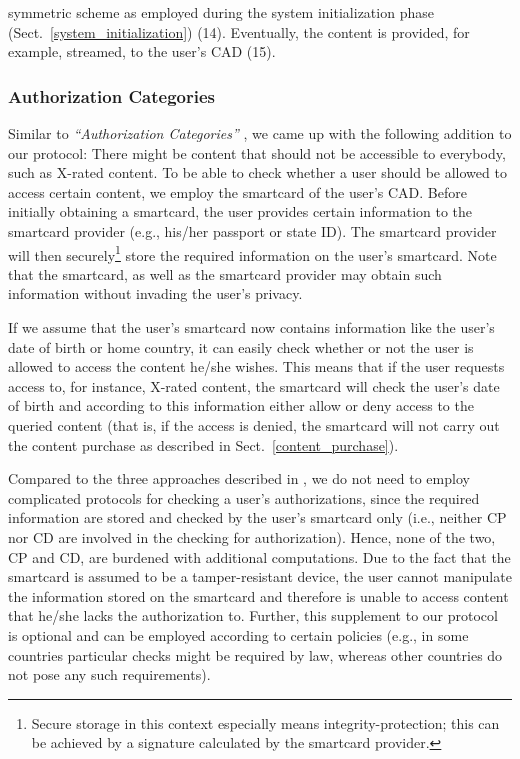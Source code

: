 \documentclass{llncs}
\newcommand{\refSec}[1]{Sect.~\ref{#1}}
\begin{document}
symmetric scheme as employed during the system initialization phase (\refSec{system_initialization}) (14). Eventually, the content is provided, for example, streamed, to the user's CAD (15). 




\subsubsection{Authorization Categories} \label{authorization_categories}

Similar to \emph{``Authorization Categories''} \cite{perlman_privacy_preserving}, we came up with the following addition to our protocol: There might be content that should not be accessible to everybody, such as X-rated content. To be able to check whether a user should be allowed to access certain content, we employ the smartcard of the user's CAD. Before initially obtaining a smartcard, the user provides certain information to the smartcard provider (e.g., his/her passport or state ID). The smartcard provider will then securely\footnote{Secure storage in this context especially means integrity-protection; this can be achieved by a signature calculated by the smartcard provider.} store the required information on the user's smartcard. Note that the smartcard, as well as the smartcard provider may obtain such information without invading the user's privacy.

If we assume that the user's smartcard now contains information like the user's date of birth or home country, it can easily check whether or not the user is allowed to access the content he/she wishes. This means that if the user requests access to, for instance, X-rated content, the smartcard will check the user's date of birth and according to this information either allow or deny access to the queried content (that is, if the access is denied, the smartcard will not carry out the content purchase as described in \refSec{content_purchase}).

Compared to the three approaches described in \cite{perlman_privacy_preserving}, we do not need to employ complicated protocols for checking a user's authorizations, since the required information are stored and checked by the user's smartcard only (i.e., neither CP nor CD are involved in the checking for authorization). Hence, none of the two, CP and CD, are burdened with additional computations. Due to the fact that the smartcard is assumed to be a tamper-resistant device, the user cannot manipulate the information stored on the smartcard and therefore is unable to access content that he/she lacks the authorization to. Further, this supplement to our protocol is optional and can be employed according to certain policies (e.g., in some countries particular checks might be required by law, whereas other countries do not pose any such requirements).
\end{document}
